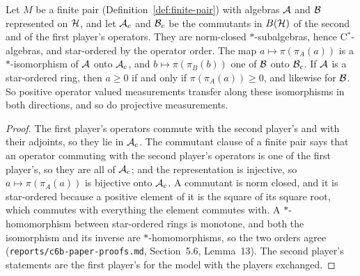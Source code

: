 \begin{lemma}
\label{lem:finite-pair-order}
\leanok
Let $M$ be a finite pair (Definition~\ref{def:finite-pair}) with algebras $\cal{A}$ and $\cal{B}$
represented on $\mH$, and let $\cal{A}_c$ and $\cal{B}_c$ be the commutants in $B(\mH)$ of the
second and of the first player's operators. They are norm-closed $*$-subalgebras, hence
C$^*$-algebras, and star-ordered by the operator order. The map $a \mapsto \pi(\pi_A(a))$ is a
$*$-isomorphism of $\cal{A}$ onto $\cal{A}_c$, and $b \mapsto \pi(\pi_B(b))$ one of $\cal{B}$ onto
$\cal{B}_c$. If $\cal{A}$ is a star-ordered ring, then $a \geq 0$ if and only if $\pi(\pi_A(a))
\geq 0$, and likewise for $\cal{B}$. So positive operator valued measurements transfer along these
isomorphisms in both directions, and so do projective measurements.
\end{lemma}

\begin{proof}
\leanok
The first player's operators commute with the second player's and with their adjoints, so they lie
in $\cal{A}_c$. The commutant clause of a finite pair says that an operator commuting with the
second player's operators is one of the first player's, so they are all of $\cal{A}_c$; and the
representation is injective, so $a \mapsto \pi(\pi_A(a))$ is bijective onto $\cal{A}_c$. A
commutant is norm closed, and it is star-ordered because a positive element of it is the square of
its square root, which commutes with everything the element commutes with. A $*$-homomorphism
between star-ordered rings is monotone, and both the isomorphism and its inverse are
$*$-homomorphisms, so the two orders agree (\texttt{reports/c6b-paper-proofs.md}, Section~5.6,
Lemma~13). The second player's statements are the first player's for the model with the players
exchanged.
\end{proof}

